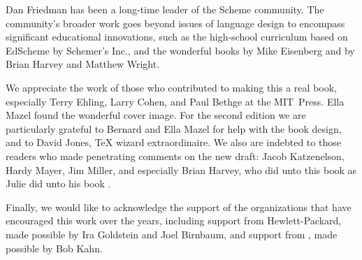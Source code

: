 Dan Friedman has been a long-time leader of the Scheme community.
The community’s broader work goes beyond issues of language design to encompass significant educational innovations, such as the high-school curriculum based on EdScheme by Schemer’s Inc., and the wonderful books by Mike Eisenberg and by Brian Harvey and Matthew Wright.

We appreciate the work of those who contributed to making this a real book, especially Terry Ehling, Larry Cohen, and Paul Bethge at the MIT Press.
Ella Mazel found the wonderful cover image.
For the second edition we are particularly grateful to Bernard and Ella Mazel for help with the book design, and to David Jones, \TeX{} wizard extraordinaire.
We also are indebted to those readers who made penetrating comments on the new draft:
Jacob Katzenelson, Hardy Mayer, Jim Miller, and especially Brian Harvey, who did unto this book as Julie did unto his book .

Finally, we would like to acknowledge the support of the organizations that have encouraged this work over the years, including support from Hewlett-Packard, made possible by Ira Goldstein and Joel Birnbaum, and support from , made possible by Bob Kahn.
